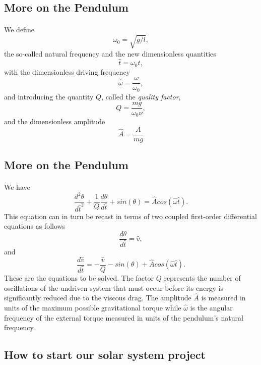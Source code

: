 \documentclass[%
oneside,                 %
final,                   %
10pt]{article}
\begin{document}
\subsection{More on the Pendulum}

\paragraph{}
We define 
  \[
      \omega_0=\sqrt{g/l},
  \]
the so-called natural frequency and the new dimensionless quantities
  \[
      \hat{t}=\omega_0t,
  \]
with the dimensionless driving frequency
  \[
     \hat{\omega}=\frac{\omega}{\omega_0},
  \]
and introducing the quantity $Q$, called the \emph{quality factor},
  \[
     Q=\frac{mg}{\omega_0\nu},
  \]
  and the dimensionless amplitude 
\[
\hat{A}=\frac{A}{mg}
  \]



\subsection{More on the Pendulum}

\paragraph{}
We have 
\[
    \frac{d^2\theta}{d\hat{t}^2}+\frac{1}{Q}\frac{d\theta}{d\hat{t}}  
     +sin(\theta)=\hat{A}cos(\hat{\omega}\hat{t}).
\]
This equation can in turn be recast in terms of two coupled first-order differential equations as follows
\[
     \frac{d\theta}{d\hat{t}}=\hat{v},
\]
and
\[
     \frac{d\hat{v}}{d\hat{t}}=-\frac{\hat{v}}{Q}-sin(\theta)+\hat{A}cos(\hat{\omega}\hat{t}).
\]
These are the equations to be solved.  The factor $Q$ represents the number of oscillations of the undriven system that must occur before  its energy is significantly reduced due to the viscous drag. The  amplitude $\hat{A}$ is measured in units of the maximum possible  gravitational torque while $\hat{\omega}$ is the angular frequency of the external torque measured in units of the pendulum's natural frequency.




\subsection{How to start our solar system project}
\end{document}
